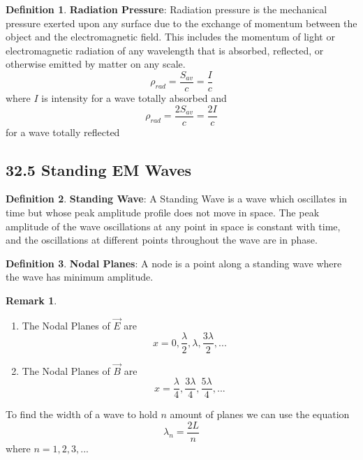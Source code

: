 \documentclass[12pt]{amsart}
\theoremstyle{definition}
\newtheorem{definition}{Definition} %
\newtheorem*{remark}{Remark}        %
\numberwithin{equation}{theorem}    %
\begin{document}
\begin{definition}
    \textbf{Radiation Pressure}:
    Radiation pressure is the mechanical pressure exerted upon any surface due to the exchange of momentum between the object and the electromagnetic field. This includes the momentum of light or electromagnetic radiation of any wavelength that is absorbed, reflected, or otherwise emitted by matter on any scale. 
    $$\rho_{rad} = \frac{S_{av}}{c} = \frac{I}{c}$$ where $I$ is intensity for a wave totally absorbed and $$\rho_{rad} = \frac{2S_{av}}{c} = \frac{2I}{c}$$ for a wave totally reflected
\end{definition}

\subsection*{32.5 Standing EM Waves}

\begin{definition}
    \textbf{Standing Wave}:
    A Standing Wave is a wave which oscillates in time but whose peak amplitude profile does not move in space. The peak amplitude of the wave oscillations at any point in space is constant with time, and the oscillations at different points throughout the wave are in phase.
\end{definition}

\begin{definition}
    \textbf{Nodal Planes}:
    A node is a point along a standing wave where the wave has minimum amplitude.
    \begin{remark}
        \begin{enumerate}
            \item The Nodal Planes of $\vec{E}$ are $$x = 0, \frac{\lambda}{2}, \lambda, 
            \frac{3\lambda}{2},...$$
            \item The Nodal Planes of $\vec{B}$ are $$x = \frac{\lambda}{4}, \frac{3\lambda}{4},
            \frac{5\lambda}{4},...$$
        \end{enumerate}
        To find the width of a wave to hold $n$ amount of planes we can use the equation
        $$\lambda_n = \frac{2L}{n}$$ where $n = 1,2,3,...$
        
    \end{remark}
\end{definition}
\end{document}
